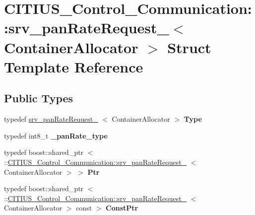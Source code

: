 \hypertarget{struct_c_i_t_i_u_s___control___communication_1_1srv__pan_rate_request__}{\section{\-C\-I\-T\-I\-U\-S\-\_\-\-Control\-\_\-\-Communication\-:\-:srv\-\_\-pan\-Rate\-Request\-\_\-$<$ \-Container\-Allocator $>$ \-Struct \-Template \-Reference}
\label{struct_c_i_t_i_u_s___control___communication_1_1srv__pan_rate_request__}
}
\subsection*{\-Public \-Types}
\begin{DoxyCompactItemize}
\item 
\hypertarget{struct_c_i_t_i_u_s___control___communication_1_1srv__pan_rate_request___ac2741c3dff6699cd09fcb74f8a5a6194}{typedef \hyperlink{struct_c_i_t_i_u_s___control___communication_1_1srv__pan_rate_request__}{srv\-\_\-pan\-Rate\-Request\-\_\-}\*
$<$ \-Container\-Allocator $>$ {\bfseries \-Type}}\label{struct_c_i_t_i_u_s___control___communication_1_1srv__pan_rate_request___ac2741c3dff6699cd09fcb74f8a5a6194}

\item 
\hypertarget{struct_c_i_t_i_u_s___control___communication_1_1srv__pan_rate_request___aea5831f1f35f245d65c25e8fadef5ac8}{typedef int8\-\_\-t {\bfseries \-\_\-pan\-Rate\-\_\-type}}\label{struct_c_i_t_i_u_s___control___communication_1_1srv__pan_rate_request___aea5831f1f35f245d65c25e8fadef5ac8}

\item 
\hypertarget{struct_c_i_t_i_u_s___control___communication_1_1srv__pan_rate_request___aca671bcad7004baf902033484fcf84a1}{typedef boost\-::shared\-\_\-ptr\*
$<$ \-::\hyperlink{struct_c_i_t_i_u_s___control___communication_1_1srv__pan_rate_request__}{\-C\-I\-T\-I\-U\-S\-\_\-\-Control\-\_\-\-Communication\-::srv\-\_\-pan\-Rate\-Request\-\_\-}\*
$<$ \-Container\-Allocator $>$ $>$ {\bfseries \-Ptr}}\label{struct_c_i_t_i_u_s___control___communication_1_1srv__pan_rate_request___aca671bcad7004baf902033484fcf84a1}

\item 
\hypertarget{struct_c_i_t_i_u_s___control___communication_1_1srv__pan_rate_request___a31ade024d842c8ef8635d709cf9bd8a3}{typedef boost\-::shared\-\_\-ptr\*
$<$ \-::\hyperlink{struct_c_i_t_i_u_s___control___communication_1_1srv__pan_rate_request__}{\-C\-I\-T\-I\-U\-S\-\_\-\-Control\-\_\-\-Communication\-::srv\-\_\-pan\-Rate\-Request\-\_\-}\*
$<$ \-Container\-Allocator $>$ const  $>$ {\bfseries \-Const\-Ptr}}\label{struct_c_i_t_i_u_s___control___communication_1_1srv__pan_rate_request___a31ade024d842c8ef8635d709cf9bd8a3}

\end{DoxyCompactItemize}
